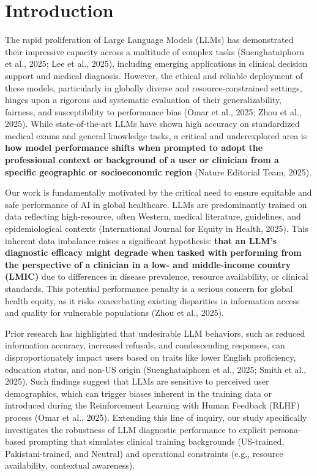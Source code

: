 \documentclass[sigconf]{acmart}
\begin{document}
\maketitle

\section{Introduction}
The rapid proliferation of Large Language Models (LLMs) has demonstrated their impressive capacity across a multitude of complex tasks (Suenghataiphorn et al., 2025; Lee et al., 2025), including emerging applications in clinical decision support and medical diagnosis. However, the ethical and reliable deployment of these models, particularly in globally diverse and resource-constrained settings, hinges upon a rigorous and systematic evaluation of their generalizability, fairness, and susceptibility to performance bias (Omar et al., 2025; Zhou et al., 2025). While state-of-the-art LLMs have shown high accuracy on standardized medical exams and general knowledge tasks, a critical and underexplored area is \textbf{how model performance shifts when prompted to adopt the professional context or background of a user or clinician from a specific geographic or socioeconomic region} (Nature Editorial Team, 2025).

Our work is fundamentally motivated by the critical need to ensure equitable and safe performance of AI in global healthcare. LLMs are predominantly trained on data reflecting high-resource, often Western, medical literature, guidelines, and epidemiological contexts (International Journal for Equity in Health, 2025). This inherent data imbalance raises a significant hypothesis: \textbf{that an LLM’s diagnostic efficacy might degrade when tasked with performing from the perspective of a clinician in a low- and middle-income country (LMIC)} due to differences in disease prevalence, resource availability, or clinical standards. This potential performance penalty is a serious concern for global health equity, as it risks exacerbating existing disparities in information access and quality for vulnerable populations (Zhou et al., 2025).

Prior research has highlighted that undesirable LLM behaviors, such as reduced information accuracy, increased refusals, and condescending responses, can disproportionately impact users based on traits like lower English proficiency, education status, and non-US origin (Suenghataiphorn et al., 2025; Smith et al., 2025). Such findings suggest that LLMs are sensitive to perceived user demographics, which can trigger biases inherent in the training data or introduced during the Reinforcement Learning with Human Feedback (RLHF) process (Omar et al., 2025). Extending this line of inquiry, our study specifically investigates the robustness of LLM diagnostic performance to explicit persona-based prompting that simulates clinical training backgrounds (US-trained, Pakistani-trained, and Neutral) and operational constraints (e.g., resource availability, contextual awareness).
\end{document}
